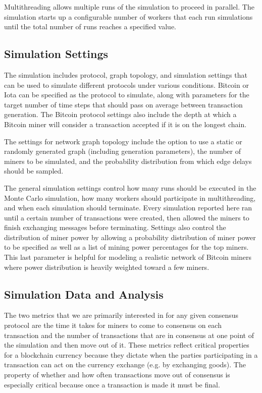 \documentclass[letterpaper,11pt]{article}
\begin{document}
Multithreading allows multiple runs of the simulation to proceed in parallel. The simulation starts up a configurable number of workers that each run simulations until the total number of runs reaches a specified value.

\subsection{Simulation Settings}
The simulation includes protocol, graph topology, and simulation settings that can be used to simulate different protocols under various conditions. Bitcoin or Iota can be specified as the protocol to simulate, along with parameters for the target number of time steps that should pass on average between transaction generation. The Bitcoin protocol settings also include the depth at which a Bitcoin miner will consider a transaction accepted if it is on the longest chain.

The settings for network graph topology include the option to use a static or randomly generated graph (including generation parameters), the number of miners to be simulated, and the probability distribution from which edge delays should be sampled.

The general simulation settings control how many runs should be executed in the Monte Carlo simulation, how many workers should participate in multithreading, and when each simulation should terminate. Every simulation reported here ran until a certain number of transactions were created, then allowed the miners to finish exchanging messages before terminating. Settings also control the distribution of miner power by allowing a probability distribution of miner power to be specified as well as a list of mining power percentages for the top miners. This last parameter is helpful for modeling a realistic network of Bitcoin miners where power distribution is heavily weighted toward a few miners.

\subsection{Simulation Data and Analysis}
The two metrics that we are primarily interested in for any given consensus protocol are the time it takes for miners to come to consensus on each transaction and the number of transactions that are in consensus at one point of the simulation and then move out of it. These metrics reflect critical properties for a blockchain currency because they dictate when the parties participating in a transaction can act on the currency exchange (e.g. by exchanging goods). The property of whether and how often transactions move out of consensus is especially critical because once a transaction is made it must be final.
\end{document}
